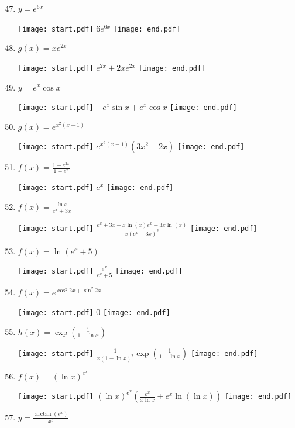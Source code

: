 \documentclass[12pt]{article}
\begin{document}
\begin{enumerate}
\setcounter{enumi}{46}

\item $y = e^{6x}$ 

\texttt{[image: start.pdf]}
{{$6e^{6x}$}}
\texttt{[image: end.pdf]}


\item $g(x) = xe^{2x}$ 

\texttt{[image: start.pdf]}
{{$e^{2x}+2xe^{2x}$}}
\texttt{[image: end.pdf]}


\item $y = e^x\cos {x}$ 

\texttt{[image: start.pdf]}
{{$-e^{x}\sin{x}+e^{x}\cos{x}$}}
\texttt{[image: end.pdf]}


\item $g(x) = e^{x^2(x-1)}$ 

\texttt{[image: start.pdf]}
{{$e^{x^2(x-1)}(3x^2-2x)$}}
\texttt{[image: end.pdf]}


\item $f(x) = \frac{1-e^{2x}}{1-e^x}$ 

\texttt{[image: start.pdf]}
{{$e^x$}}
\texttt{[image: end.pdf]}


\item $f(x) = \frac{\ln{x}}{e^{x}+3x}$ 

\texttt{[image: start.pdf]}
{{$\frac{e^x+3x-x\ln{(x)}e^x-3x\ln{(x)}}{x(e^x+3x)^2}$}}
\texttt{[image: end.pdf]}


\item $f(x) = \ln{(e^{x}+5)}$ 

\texttt{[image: start.pdf]}
{{$\frac{e^{x}}{e^{x}+5}$}}
\texttt{[image: end.pdf]}


\item $f(x) = e^{\cos^2{2x}+\sin^2{2x}}$ 

\texttt{[image: start.pdf]}
{{0}}
\texttt{[image: end.pdf]}


\item $h(x) = \exp{\left(\frac{1}{1-\ln x}\right)}$ 

\texttt{[image: start.pdf]}
{{$\frac{1}{x(1-\ln{x})^2}\exp{\left(\frac{1}{1-\ln x}\right)}$}}
\texttt{[image: end.pdf]}


\item $f(x) = (\ln{x})^{e^{x}}$ 

\texttt{[image: start.pdf]}
{{$(\ln{x})^{e^{x}}\left(\frac{e^{x}}{x\ln{x}}+e^{x}\ln{(\ln{x})}\right)$}}
\texttt{[image: end.pdf]}


\item $y = \frac{\arctan{(e^x)}}{x^3}$ 


\end{enumerate}
\end{document}
